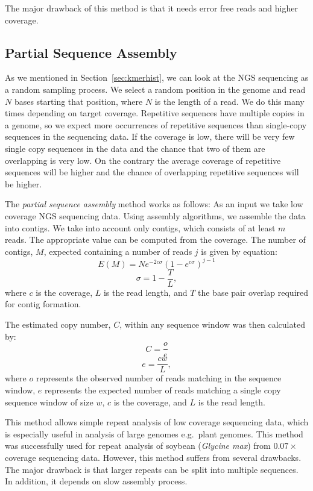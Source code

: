 The major drawback of this method is that it needs error free reads and higher coverage.

\subsection{Partial Sequence Assembly}

As we mentioned in Section~\ref{sec:kmerhist}, we can look at the NGS sequencing as a random sampling process. We select a random position in the genome and read $N$ bases starting that position, where $N$ is the length of a read. We do this many times depending on target coverage.
Repetitive sequences have multiple copies in a genome, so we expect more occurrences of repetitive sequences than single-copy sequences in the sequencing data. If the coverage is low, there will be very few single copy sequences in the data and the chance that two of them are overlapping is very low. On the contrary the average coverage of repetitive sequences will be higher and the chance of overlapping repetitive sequences will be higher.

The \emph{partial sequence assembly} method works as follows: As an input we take low coverage NGS sequencing data. Using assembly algorithms, we assemble the data into contigs. We take into account only contigs, which consists of at least $m$ reads. The appropriate value can be computed from the coverage. The number of contigs, $M$, expected containing a number of reads $j$ is given by equation\cite{swaminathan2007global}:
$$E(M) = Ne^{-2c\sigma}{(1-e^{c\sigma})}^{j-1}$$
$$\sigma = 1 - \frac{T}{L},$$
where $c$ is the coverage, $L$ is the read length, and $T$ the base pair overlap required for contig formation.

The estimated copy number, $C$, within any sequence window was then calculated by\cite{swaminathan2007global}:
$$C = \frac{o}{e}$$
$$e = \frac{cw}{L},$$
where $o$ represents the observed number of reads matching in the sequence window, $e$ represents the expected number of reads matching a single copy sequence window of size $w$, $c$ is the coverage, and $L$ is the read length.

This method allows simple repeat analysis of low coverage sequencing data, which is especially useful in analysis of large genomes e.g.\ plant genomes. This method was successfully used for repeat analysis of soybean (\textit{Glycine max}) from $0.07\times$ coverage sequencing data\cite{swaminathan2007global}.
However, this method suffers from several drawbacks. The major drawback is that larger repeats can be split into multiple sequences. In addition, it depends on slow assembly process.

